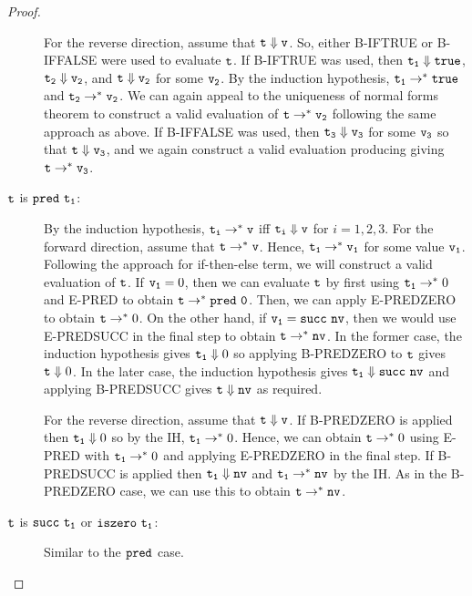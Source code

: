 \begin{proof}
\begin{description}
        For the reverse direction, assume that $\mathtt{t} \Downarrow \mathtt{v}$.  So, either B-IFTRUE or
        B-IFFALSE were used to evaluate $\mathtt{t}$.  If B-IFTRUE was used, then 
        $\mathtt{t_1} \Downarrow \mathtt{true}$, $\mathtt{t_2} \Downarrow \mathtt{v_2}$, and 
        $\mathtt{t} \Downarrow \mathtt{v_2}$ for some $\mathtt{v_2}$.  
        By the induction hypothesis, $\mathtt{t_1} \rightarrow^* \mathtt{true}$ and
        $\mathtt{t_2} \rightarrow^* \mathtt{v_2}$.  We can again appeal to the uniqueness of normal forms theorem
        to construct a valid evaluation of $\mathtt{t} \rightarrow^* \mathtt{v_2}$ following the same approach as 
        above. If B-IFFALSE was used, then
        $\mathtt{t_3} \Downarrow \mathtt{v_3}$ for some $\mathtt{v_3}$
        so that $\mathtt{t} \Downarrow \mathtt{v_3}$, and we again
        construct a valid evaluation producing giving $\mathtt{t} \rightarrow^* \mathtt{v_3}$.
    \item[$\mathtt{t}$ is $\mathtt{pred}\,\,\mathtt{t_1}$:] By the induction hypothesis,
        $\mathtt{t_i} \rightarrow^* \mathtt{v}$ iff $\mathtt{t_i} \Downarrow \mathtt{v}$ for $i = 1, 2, 3$.
        For the forward direction, assume that $\mathtt{t} \rightarrow^* \mathtt{v}$.  Hence, 
        $\mathtt{t_1} \rightarrow^* \mathtt{v_1}$ for some value $\mathtt{v_1}$.  Following the approach for
        if-then-else term, we will construct a valid evaluation of $\mathtt{t}$.  If $\mathtt{v_1} = 0$,
        then we can evaluate $\mathtt{t}$ by first using $\mathtt{t_1} \rightarrow^* 0$ and E-PRED to obtain
        $\mathtt{t} \rightarrow^* \mathtt{pred}\,\,\mathtt{0}$.  Then, we can apply E-PREDZERO to obtain $\mathtt{t} \rightarrow^* 0$.
        On the other hand, if $\mathtt{v_1} = \mathtt{succ}\,\,\mathtt{\mathtt{nv}}$, then we would use E-PREDSUCC in the final
        step to obtain $\mathtt{t} \rightarrow^* \mathtt{nv}$.  In the former case, the induction hypothesis gives
        $\mathtt{t_1} \Downarrow 0$ so applying B-PREDZERO to $\mathtt{t}$ gives $\mathtt{t} \Downarrow 0$.
        In the later case, the induction hypothesis gives $\mathtt{t_1} \Downarrow \mathtt{succ}\,\,\mathtt{\mathtt{nv}}$ and
        applying B-PREDSUCC gives $\mathtt{t} \Downarrow \mathtt{nv}$ as required.

        For the reverse direction, assume that $\mathtt{t} \Downarrow \mathtt{v}$.  
        If B-PREDZERO is applied then $\mathtt{t_1} \Downarrow 0$ so by the IH, $\mathtt{t_1} \rightarrow^* 0$.
        Hence, we can obtain $\mathtt{t} \rightarrow^* 0$ using E-PRED with $\mathtt{t_1} \rightarrow^* 0$ and applying
        E-PREDZERO in the final step.  If B-PREDSUCC is applied then $\mathtt{t_1} \Downarrow \mathtt{nv}$
        and $\mathtt{t_1} \rightarrow^* \mathtt{nv}$ by the IH.  As in the B-PREDZERO case, we can use this
        to obtain $\mathtt{t} \rightarrow^* \mathtt{nv}$.

    \item[$\mathtt{t}$ is $\mathtt{succ}\,\,\mathtt{\mathtt{t_1}}$ or $\mathtt{iszero}\,\,\mathtt{\mathtt{t_1}}$:]
        Similar to the $\mathtt{pred}$ case.
\end{description}
\end{proof}

